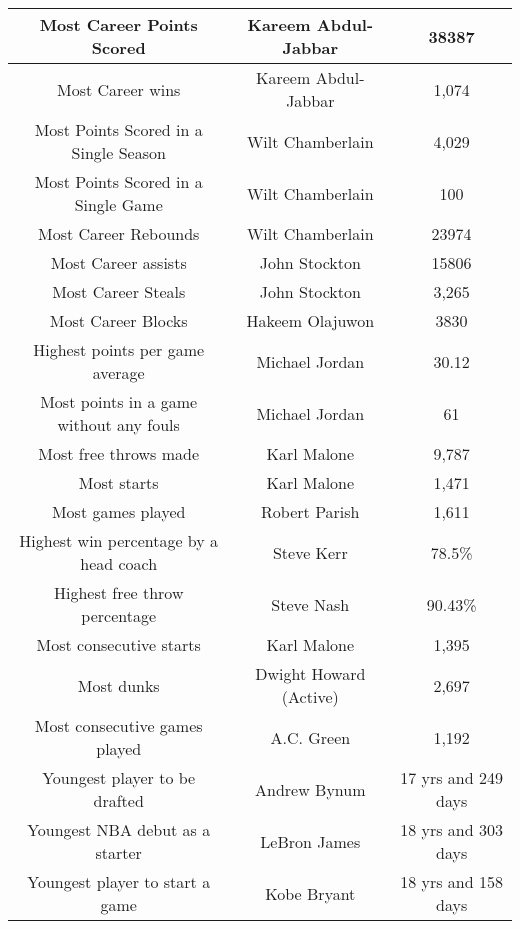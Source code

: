 			\begin{center}
				\begin{tabular}{|c|c|c|}
					\hline
					Most Career Points Scored & Kareem Abdul-Jabbar & 38387 \\
					\hline
					 Most Career wins & Kareem Abdul-Jabbar & 1,074 \\
					\hline			
					Most Points Scored in a Single Season &  Wilt Chamberlain & 4,029 \\
					\hline
					Most Points Scored in a Single Game & Wilt Chamberlain & 100 \\
					\hline
					Most Career Rebounds & Wilt Chamberlain & 23974 \\
					\hline
					Most Career assists & John Stockton & 15806 \\
					\hline
					Most Career Steals & John Stockton & 3,265 \\
					\hline
					Most Career Blocks & Hakeem Olajuwon & 3830 \\
					\hline
					Highest points per game average & Michael Jordan & 30.12 \\
					\hline
				    Most points in a game without any fouls & Michael Jordan & 61 \\
				    \hline
				    Most free throws made & Karl Malone & 9,787 \\
				    \hline
			        Most starts & Karl Malone & 1,471 \\
			        \hline
			        Most games played & Robert Parish & 1,611 \\
			        \hline
			        Highest win percentage by a head coach& Steve Kerr & 78.5\% \\
			        \hline
		            Highest free throw percentage & Steve Nash & 90.43\%  \\
		            \hline
			        Most consecutive starts & Karl Malone & 1,395\\
			        \hline
		            Most dunks & Dwight Howard (Active) & 2,697 \\
			        \hline
		            Most consecutive games played & A.C. Green &  1,192 \\
		            \hline
		            Youngest player to be drafted & Andrew Bynum & 17 yrs and 249 days \\
		            \hline
		            Youngest NBA debut as a starter & LeBron James& 18 yrs and 303 days \\
		            \hline
	                Youngest player to start a game & Kobe Bryant & 18 yrs and 158 days \\
	                \hline	                
	                
	                
	                
		            
				      
				\end{tabular}	
			
			
			
			
			\end{center}		

